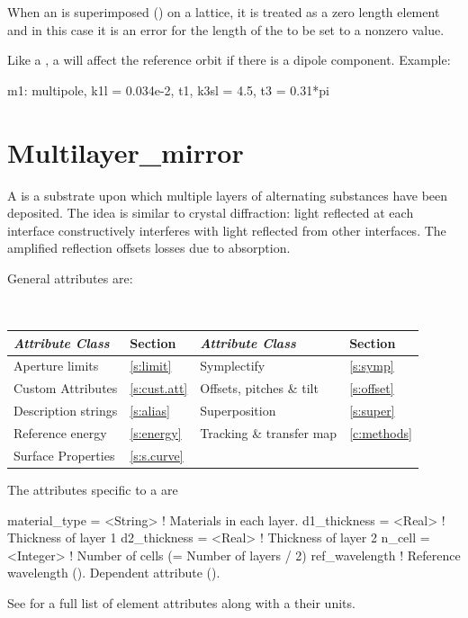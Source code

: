 {When an  is superimposed () on a lattice, it is
treated as a zero length element and in this case it is an error for the length
of the  to be set to a nonzero value.

Like a \mad {}, a \bmad {} will affect the
reference orbit if there is a dipole component. 
Example:
\begin{example}
  m1: multipole, k1l = 0.034e-2, t1, k3sl = 4.5, t3 = 0.31*pi
\end{example}

\section{Multilayer_mirror}
\label{s:multilayer}

A  is a substrate upon which multiple layers of alternating substances have
been deposited. The idea is similar to crystal diffraction: light reflected at each interface
constructively interferes with light reflected from other interfaces. The amplified reflection
offsets losses due to absorption.

General  attributes are:
\begin{center}
\tt
\begin{tabular}{llll} \toprule
  {\sl Attribute Class}      & Section           & {\sl Attribute Class}      & Section         \\ \midrule
  Aperture limits            & \ref{s:limit}     & Symplectify                & \ref{s:symp}    \\
  Custom Attributes          & \ref{s:cust.att}  & Offsets, pitches \& tilt   & \ref{s:offset}  \\
  Description strings        & \ref{s:alias}     & Superposition              & \ref{s:super}   \\
  Reference energy           & \ref{s:energy}    & Tracking \& transfer map   & \ref{c:methods} \\
  Surface Properties         & \ref{s:s.curve}   &                            &                 \\
  \bottomrule
\end{tabular}
\end{center}
\toffset

The attributes specific to a  are 
\begin{example}
  material_type    = <String>  ! Materials in each layer.
  d1_thickness     = <Real>    ! Thickness of layer 1
  d2_thickness     = <Real>    ! Thickness of layer 2
  n_cell           = <Integer> ! Number of cells (= Number of layers / 2)
  ref_wavelength               ! Reference wavelength (). Dependent attribute ().
\end{example}
See  for a full list of element attributes along with a their units.

}
